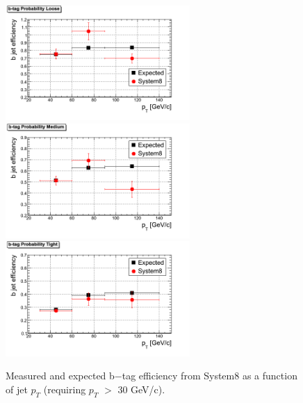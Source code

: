 \begin{figure}[htbp]
  \begin{center}
    \includegraphics[width=70mm]{Figures/JPL_Tag.png}
    \includegraphics[width=70mm]{Figures/JPM_Tag.png}
    \includegraphics[width=70mm]{Figures/JPT_Tag.png}
  \end{center}
  \caption{Measured and expected b$-$tag efficiency from System8 as a function of jet $p_T $ (requiring $p_T $ $> $ 30 GeV/c).}
  \label{fig:S8_JP_results}
\end{figure}

\clearpage

